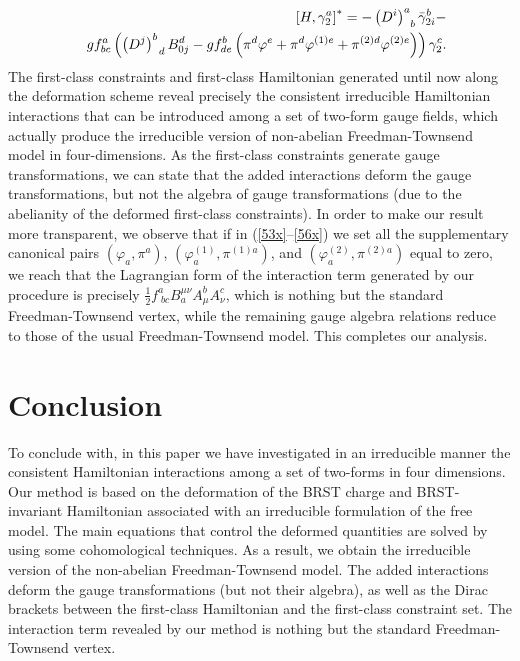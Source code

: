 \documentclass[a4paper,12pt]{article}
\begin{document}
\begin{eqnarray}
&&\left[ H,\gamma _{2}^{a}\right] ^{*}=-\left( D^{i}\right) _{\;\;b}^{a}\bar{%
\gamma}_{2i}^{b}-  \nonumber \\
&&gf_{bc}^{a}\left( \left( D^{j}\right)
_{\;\;d}^{b}B_{0j}^{d}-gf_{de}^{b}\left( \pi ^{d}\varphi ^{e}+\pi
^{d}\varphi ^{(1)e}+\pi ^{(2)d}\varphi ^{(2)e}\right) \right) \gamma
_{2}^{c}.  \label{56x}
\end{eqnarray}
The first-class constraints and first-class Hamiltonian generated until now
along the deformation scheme reveal precisely the consistent irreducible
Hamiltonian interactions that can be introduced among a set of two-form
gauge fields, which actually produce the irreducible version of non-abelian
Freedman-Townsend model in four-dimensions. As the first-class constraints
generate gauge transformations, we can state that the added interactions
deform the gauge transformations, but not the algebra of gauge
transformations (due to the abelianity of the deformed first-class
constraints). In order to make our result more transparent, we observe that
if in (\ref{53x}--\ref{56x}) we set all the supplementary canonical pairs $%
\left( \varphi _{a},\pi ^{a}\right) $, $\left( \varphi _{a}^{(1)},\pi
^{(1)a}\right) $, and $\left( \varphi _{a}^{(2)},\pi ^{(2)a}\right) $ equal
to zero, we reach that the Lagrangian form of the interaction term generated
by our procedure is precisely $\frac{1}{2}f_{\;bc}^{a}B_{a}^{\mu \nu }A_{\mu
}^{b}A_{\nu }^{c}$, which is nothing but the standard Freedman-Townsend
vertex, while the remaining gauge algebra relations reduce to those of the
usual Freedman-Townsend model. This completes our analysis.

\section{Conclusion}

To conclude with, in this paper we have investigated in an irreducible
manner the consistent Hamiltonian interactions among a set of two-forms in
four dimensions. Our method is based on the deformation of the BRST charge
and BRST-invariant Hamiltonian associated with an irreducible formulation of
the free model. The main equations that control the deformed quantities are
solved by using some cohomological techniques. As a result, we obtain the
irreducible version of the non-abelian Freedman-Townsend model. The added
interactions deform the gauge transformations (but not their algebra), as
well as the Dirac brackets between the first-class Hamiltonian and the
first-class constraint set. The interaction term revealed by our method is
nothing but the standard Freedman-Townsend vertex.
\end{document}

